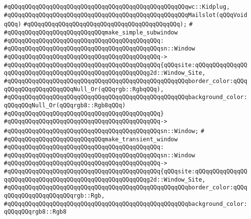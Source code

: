 \verb|#qQQqqQQqqQQqqQQqqQQqqQQqqQQqqQQqqQQqqQQqqQQqqQQqqQQqwc::Kidplug,|\newline
\verb|#qQQqqQQqqQQqqQQqqQQqqQQqqQQqqQQqqQQqqQQqqQQqqQQqqQQqMailslot(qQQqVoidqQQq)|\newline
\verb|#qQQqqQQqqQQqqQQqqQQqqQQqqQQqqQQqqQQqqQQqqQQq);|\newline
\verb|#|\newline
\verb|#qQQqqQQqqQQqqQQqqQQqqQQqqQQqmake_simple_subwindow|\newline
\verb|#qQQqqQQqqQQqqQQqqQQqqQQqqQQqqQQqqQQqqQQqqQQq:|\newline
\verb|#qQQqqQQqqQQqqQQqqQQqqQQqqQQqqQQqqQQqqQQqqQQqsn::Window|\newline
\verb|#qQQqqQQqqQQqqQQqqQQqqQQqqQQqqQQqqQQqqQQqqQQq->|\newline
\verb|#qQQqqQQqqQQqqQQqqQQqqQQqqQQqqQQqqQQqqQQqqQQq{qQQqsite:qQQqqQQqqQQqqQQqqQQqqQQqqQQqqQQqqQQqqQQqqQQqqQQqqQQqqQQqg2d::Window_Site,|\newline
\verb|#qQQqqQQqqQQqqQQqqQQqqQQqqQQqqQQqqQQqqQQqqQQqqQQqqQQqborder_color:qQQqqQQqqQQqqQQqqQQqqQQqNull_Or(qQQqrgb::RgbqQQq),|\newline
\verb|#qQQqqQQqqQQqqQQqqQQqqQQqqQQqqQQqqQQqqQQqqQQqqQQqqQQqbackground_color:qQQqqQQqNull_Or(qQQqrgb8::Rgb8qQQq)|\newline
\verb|#qQQqqQQqqQQqqQQqqQQqqQQqqQQqqQQqqQQqqQQqqQQq}|\newline
\verb|#qQQqqQQqqQQqqQQqqQQqqQQqqQQqqQQqqQQqqQQqqQQq->|\newline
\verb|#qQQqqQQqqQQqqQQqqQQqqQQqqQQqqQQqqQQqqQQqqQQqsn::Window;|\newline
\verb|#|\newline
\verb|#qQQqqQQqqQQqqQQqqQQqqQQqqQQqmake_transient_window|\newline
\verb|#qQQqqQQqqQQqqQQqqQQqqQQqqQQqqQQqqQQqqQQqqQQq:|\newline
\verb|#qQQqqQQqqQQqqQQqqQQqqQQqqQQqqQQqqQQqqQQqqQQqsn::Window|\newline
\verb|#qQQqqQQqqQQqqQQqqQQqqQQqqQQqqQQqqQQqqQQqqQQq->|\newline
\verb|#qQQqqQQqqQQqqQQqqQQqqQQqqQQqqQQqqQQqqQQqqQQq{qQQqsite:qQQqqQQqqQQqqQQqqQQqqQQqqQQqqQQqqQQqqQQqqQQqqQQqqQQqqQQqg2d::Window_Site,|\newline
\verb|#qQQqqQQqqQQqqQQqqQQqqQQqqQQqqQQqqQQqqQQqqQQqqQQqqQQqborder_color:qQQqqQQqqQQqqQQqqQQqqQQqrgb::Rgb,|\newline
\verb|#qQQqqQQqqQQqqQQqqQQqqQQqqQQqqQQqqQQqqQQqqQQqqQQqqQQqbackground_color:qQQqqQQqrgb8::Rgb8|\newline
